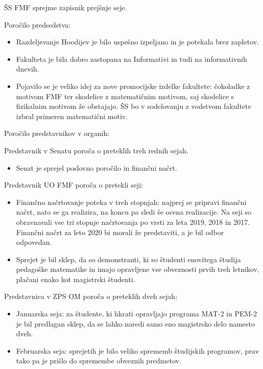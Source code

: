 \documentclass{seja}
\begin{document}
\begin{ad}
    \item
    \begin{sklep*}
        ŠS FMF sprejme zapisnik prejšnje seje.
    \end{sklep*}
    
    \item
    Poročilo predsedstva: 
    \begin{itemize}
        \item Razdeljevanje Hoodijev je bilo uspešno izpeljano in je potekala brez zapletov.
        \item Fakulteta je bila dobro zastopana na Informativi in tudi na informativnih dnevih.
        \item Pojavilo se je veliko idej za nove promocijske izdelke fakultete: čokoladke z motivom FMF ter skodelice z matematičnim motivom, saj skodelice s fizikalnim motivom že obstajajo. ŠS bo v sodelovanju z vodstvom fakultete izbral primeren matematični motiv.
    \end{itemize}
    
    \item
    Poročilo predstavnikov v organih: 
    
    Predstavnik v Senatu poroča o preteklih treh rednih sejah. 
    \begin{itemize}
        \item Senat je sprejel poslovno poročilo in finančni načrt.
    \end{itemize}
    
    Predstavnik UO FMF poroča o pretekli seji:
    \begin{itemize}
        \item Finančno načrtovanje poteka v treh stopnjah: najprej se pripravi finančni načrt, nato se ga realizira, na koncu pa sledi še ocena realizacije. Na seji so obravnavali vse tri stopnje načrtovanja po vrsti za leta 2019, 2018 in 2017. Finančni načrt za leto 2020 bi morali že predstaviti, a je bil odbor odpovedan. 
        \item Sprejet je bil sklep, da so demonstranti, ki so študenti enovitega študija pedagoške matematike in imajo opravljene vse obveznosti prvih treh letnikov, plačani enako kot magistrski študenti. 
    \end{itemize}
    
    Predstavnica v ZPS OM poroča o preteklih dveh sejah:
    \begin{itemize}
        \item Januarska seja: za študente, ki hkrati opravljajo programa MAT-2 in PEM-2 je bil predlagan sklep, da se lahko naredi samo eno magistrsko delo namesto dveh.
        \item Februarska seja: sprejetih je bilo veliko sprememb študijskih programov, prav tako pa je prišlo do spremembe obveznih predmetov.
    \end{itemize}
    

\end{ad}
\end{document}
